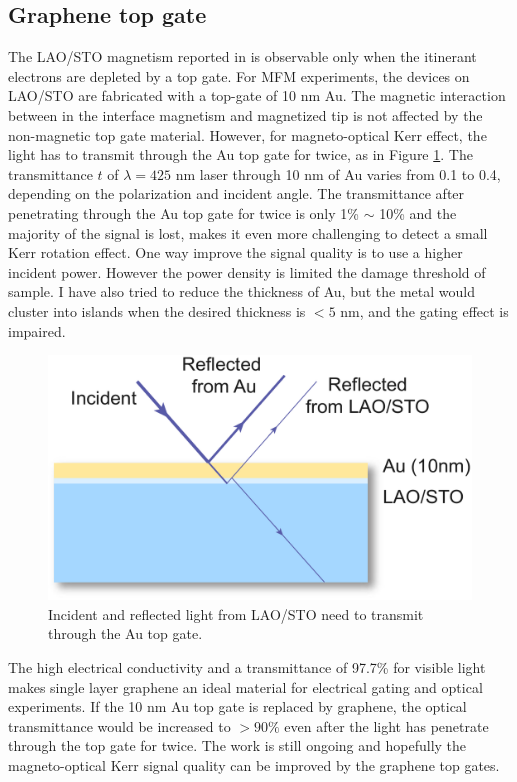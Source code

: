 \documentclass[pdflatex, sectionletters, 12pt]{pittetd}    %
\begin{document}
\subsection{Graphene top gate}

The LAO/STO magnetism reported in \cite{bi2014room} is observable only when the itinerant electrons are depleted by a top gate. For MFM experiments, the devices on LAO/STO are fabricated with a top-gate of 10 nm Au. The magnetic interaction between in the interface magnetism and magnetized tip is not affected by the non-magnetic top gate material. However, for magneto-optical Kerr effect, the light has to transmit through the Au top gate for twice, as in Figure \ref{FIG:KerrTopGate}. The transmittance $t$ of $\lambda = 425$ nm laser through 10 nm of Au varies from 0.1 to 0.4, depending on the polarization and incident angle\cite{smith1986noble}. The transmittance after penetrating through the Au top gate for twice is only 1\% $\sim$ 10\% and the majority of the signal is lost, makes it even more challenging to detect a small Kerr rotation effect. One way improve the signal quality is to use a higher incident power. However the power density is limited the damage threshold of sample. I have also tried to reduce the thickness of Au, but the metal would cluster into islands when the desired thickness is $< 5$ nm, and the gating effect is impaired.
\\

\begin{figure}[h!]
	\centering
	\includegraphics[width=.55\textwidth]{Drawing/KerrTopGate.pdf}
	\caption{Incident and reflected light from LAO/STO need to transmit through the Au top gate.}
	\label{FIG:KerrTopGate}
\end{figure}

The high electrical conductivity and a transmittance of 97.7\% for visible light\cite{nair2008fine} makes single layer graphene an ideal material for electrical gating and optical experiments. If the 10 nm Au top gate is replaced by graphene, the optical transmittance would be increased to $> 90\%$ even after the light has penetrate through the top gate for twice. The work is still ongoing and hopefully the magneto-optical Kerr signal quality can be improved by the graphene top gates.
\end{document}
